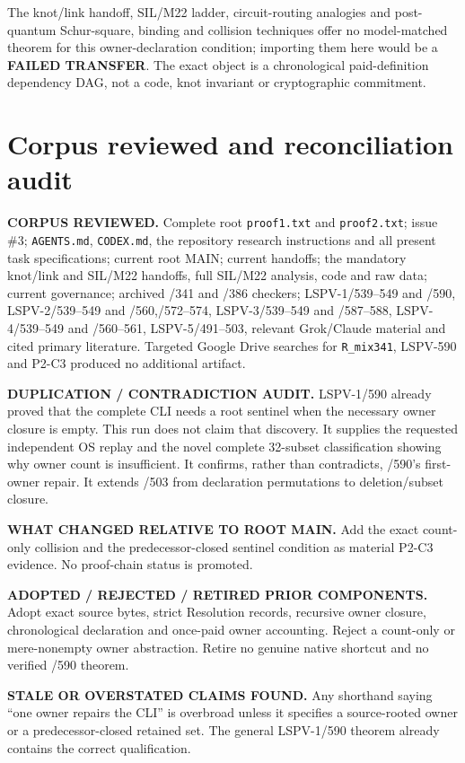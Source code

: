 \documentclass[11pt]{article}
\begin{document}
The knot/link handoff, SIL/M22 ladder, circuit-routing analogies and post-quantum Schur-square, binding and collision techniques offer no model-matched theorem for this owner-declaration condition; importing them here would be a \textbf{FAILED TRANSFER}.  The exact object is a chronological paid-definition dependency DAG, not a code, knot invariant or cryptographic commitment.

\section*{Corpus reviewed and reconciliation audit}
\textbf{CORPUS REVIEWED.}  Complete root \texttt{proof1.txt} and \texttt{proof2.txt}; issue \#3; \texttt{AGENTS.md}, \texttt{CODEX.md}, the repository research instructions and all present task specifications; current root MAIN; current handoffs; the mandatory knot/link and SIL/M22 handoffs, full SIL/M22 analysis, code and raw data; current governance; archived /341 and /386 checkers; LSPV-1/539--549 and /590, LSPV-2/539--549 and /560,/572--574, LSPV-3/539--549 and /587--588, LSPV-4/539--549 and /560--561, LSPV-5/491--503, relevant Grok/Claude material and cited primary literature.  Targeted Google Drive searches for \texttt{R\_mix341}, LSPV-590 and P2-C3 produced no additional artifact.

\textbf{DUPLICATION / CONTRADICTION AUDIT.}  LSPV-1/590 already proved that the complete CLI needs a root sentinel when the necessary owner closure is empty.  This run does not claim that discovery.  It supplies the requested independent OS replay and the novel complete 32-subset classification showing why owner count is insufficient.  It confirms, rather than contradicts, /590's first-owner repair.  It extends /503 from declaration permutations to deletion/subset closure.

\textbf{WHAT CHANGED RELATIVE TO ROOT MAIN.}  Add the exact count-only collision and the predecessor-closed sentinel condition as material P2-C3 evidence.  No proof-chain status is promoted.

\textbf{ADOPTED / REJECTED / RETIRED PRIOR COMPONENTS.}  Adopt exact source bytes, strict Resolution records, recursive owner closure, chronological declaration and once-paid owner accounting.  Reject a count-only or mere-nonempty owner abstraction.  Retire no genuine native shortcut and no verified /590 theorem.

\textbf{STALE OR OVERSTATED CLAIMS FOUND.}  Any shorthand saying ``one owner repairs the CLI'' is overbroad unless it specifies a source-rooted owner or a predecessor-closed retained set.  The general LSPV-1/590 theorem already contains the correct qualification.
\end{document}
